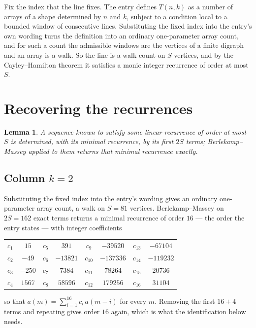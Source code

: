 \documentclass[11pt,a4paper]{article}
\theoremstyle{plain}
\newtheorem{lemma}[theorem]{Lemma}
\theoremstyle{definition}
\begin{document}
Fix the index that the line fixes. The entry defines $T(n,k)$ as a number of arrays of a shape
determined by $n$ and $k$, subject to a condition local to a bounded window of consecutive
lines. Substituting the fixed index into the entry's own wording turns the definition into an
ordinary one-parameter array count, and for such a count the admissible windows are the
vertices of a finite digraph and an array is a walk. So the line is a walk count on $S$
vertices, and by the Cayley--Hamilton theorem it satisfies a monic integer recurrence of order
at most $S$.

\section{Recovering the recurrences}

\begin{lemma}\label{lem:bm}
A sequence known to satisfy some linear recurrence of order at most $S$ is determined, with its
minimal recurrence, by its first $2S$ terms; Berlekamp--Massey applied to them returns that
minimal recurrence exactly.
\end{lemma}

\subsection*{Column $k=2$}
Substituting the fixed index into the entry's wording gives an ordinary one-parameter array
count, a walk on $S=81$ vertices. Berlekamp--Massey on $2S=162$ exact terms
returns a minimal recurrence of order $16$ --- the order the entry states --- with
integer coefficients
\begin{center}\small\begin{tabular}{cccccccc}
$c_{1}$ & $15$ & $c_{5}$ & $391$ & $c_{9}$ & $-39520$ & $c_{13}$ & $-67104$ \\
$c_{2}$ & $-49$ & $c_{6}$ & $-13821$ & $c_{10}$ & $-137336$ & $c_{14}$ & $-119232$ \\
$c_{3}$ & $-250$ & $c_{7}$ & $7384$ & $c_{11}$ & $78264$ & $c_{15}$ & $20736$ \\
$c_{4}$ & $1567$ & $c_{8}$ & $58596$ & $c_{12}$ & $179256$ & $c_{16}$ & $31104$ \\
\end{tabular}\end{center}
so that $a(m)=\sum_{i=1}^{16}c_i\,a(m-i)$ for every $m$. Removing the first
$16+4$ terms and repeating gives order $16$ again, which is what the
identification below needs.
\end{document}
